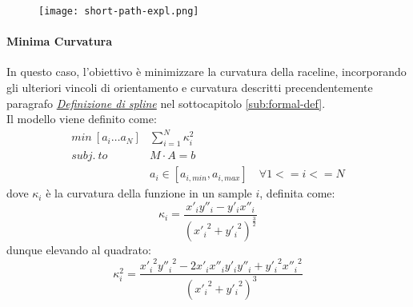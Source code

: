 \begin{figure}[h]
	\begin{center}
		\texttt{[image: short-path-expl.png]}
	\end{center}
	\caption{}\label{fig:short-path-expl}
\end{figure}

\paragraph{Minima Curvatura}
In questo caso, l'obiettivo è minimizzare la curvatura della raceline, incorporando gli ulteriori vincoli
di orientamento e curvatura descritti precendentemente paragrafo
\hyperref[par:spline-def]{\textit{Definizione di spline}} nel sottocapitolo \ref{sub:formal-def}.\\
Il modello viene definito come:
\[
	\begin{aligned}
		min\ [a_i \dots a_N] & \sum_{i=1}^{N} \kappa_i^2 \\
		subj.\ to\ & M \cdot A = b \\
		& a_i \in [a_{i, min}, a_{i, max}] \quad \forall 1 <= i <= N
	\end{aligned}
\]
dove $\kappa_i$ è la curvatura della funzione in un sample $i$, definita come:
\[
	\kappa_i = \frac{{x'_i} {y''_i} - y'_i x''_i}{({x'_i}^2 + {y'_i}^2)^\frac{3}{2}}
\]
dunque elevando al quadrato:
\[
	\kappa_i^2 = \frac{{x'_i}^2 {y''_i}^2 - 2 x'_i x''_i y'_i y''_i + {y'_i}^2 {x''_i}^2}{({x'_i}^2 + {y'_i}^2)^3}
\]


